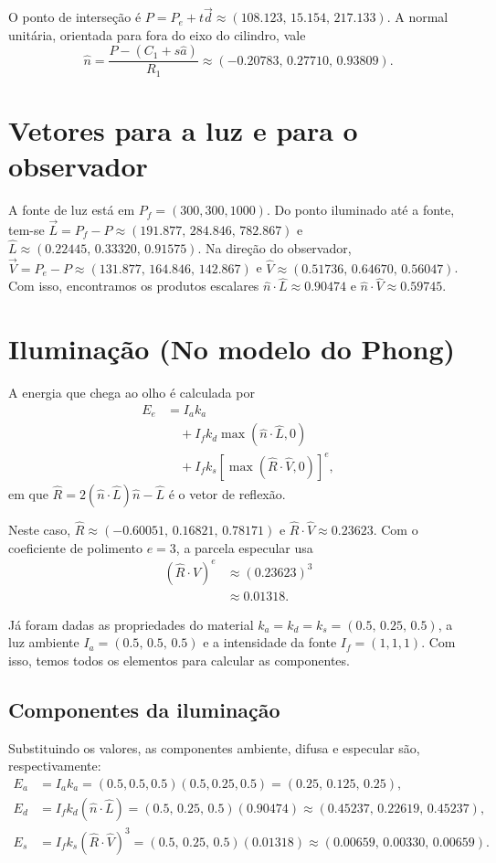 \documentclass[12pt,a4paper]{article}
\begin{document}
O ponto de interseção é \(P=P_e+t\vec d\approx(108.123,\,15.154,\,217.133)\). A normal unitária, orientada para fora do eixo do cilindro, vale
\[
  \hat n=\frac{P-(C_1+s\hat a)}{R_1}
  \approx(-0.20783,\,0.27710,\,0.93809).
\]

\section{Vetores para a luz e para o observador}

A fonte de luz está em \(P_f=(300,300,1000)\). Do ponto iluminado até a fonte, tem-se \(\vec L=P_f-P\approx(191.877,\,284.846,\,782.867)\) e \(\hat L\approx(0.22445,\,0.33320,\,0.91575)\). Na direção do observador, \(\vec V=P_e-P\approx(131.877,\,164.846,\,142.867)\) e \(\hat V\approx(0.51736,\,0.64670,\,0.56047)\). Com isso, encontramos os produtos escalares \(\hat n\cdot\hat L\approx0.90474\) e \(\hat n\cdot\hat V\approx0.59745\).

\section{Iluminação (No modelo do Phong)}

A energia que chega ao olho é calculada por
\[
  \begin{aligned}
    E_e &= I_a k_a \\
        &\quad{}+ I_f k_d\max(\hat n\cdot\hat L,0) \\
        &\quad{}+ I_f k_s\left[\max(\hat R\cdot\hat V,0)\right]^e,
  \end{aligned}
\]
em que \(\hat R=2(\hat n\cdot\hat L)\hat n-\hat L\) é o vetor de reflexão.

Neste caso, \(\hat R\approx(-0.60051,\,0.16821,\,0.78171)\) e \(\hat R\cdot\hat V\approx0.23623\). Com o coeficiente de polimento \(e=3\), a parcela especular usa
\[
  \begin{aligned}
    (\hat R\cdot\hat V)^e &\approx (0.23623)^3 \\
                            &\approx 0.01318.
  \end{aligned}
\]

Já foram dadas as propriedades do material \(k_a=k_d=k_s=(0.5,\,0.25,\,0.5)\), a luz ambiente \(I_a=(0.5,\,0.5,\,0.5)\) e a intensidade da fonte \(I_f=(1,1,1)\). Com isso, temos todos os elementos para calcular as componentes.

\subsection{Componentes da iluminação}
Substituindo os valores, as componentes ambiente, difusa e especular são, respectivamente:
\begin{align*}
  E_a &= I_a k_a=(0.5,0.5,0.5)(0.5,0.25,0.5)=(0.25,\,0.125,\,0.25), \\
  E_d &= I_f k_d(\hat n\cdot\hat L)=(0.5,\,0.25,\,0.5)(0.90474)
       \approx(0.45237,\,0.22619,\,0.45237), \\
  E_s &= I_f k_s(\hat R\cdot\hat V)^3=(0.5,\,0.25,\,0.5)(0.01318)
       \approx(0.00659,\,0.00330,\,0.00659).
\end{align*}
\end{document}
